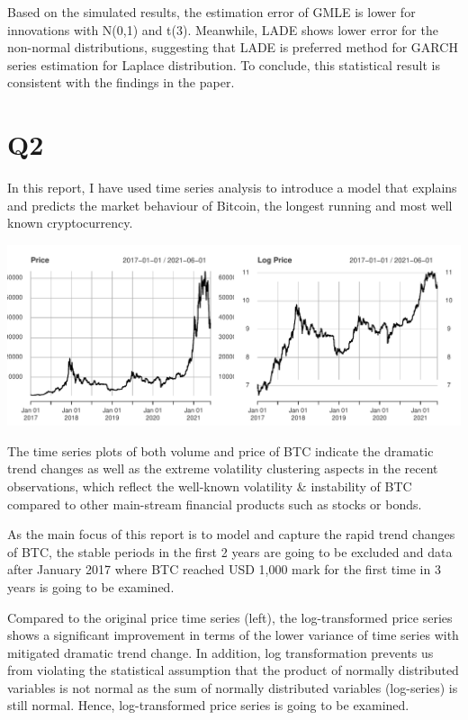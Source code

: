 \documentclass[
  11pt,
]{article}
\begin{document}
Based on the simulated results, the estimation error of GMLE is lower
for innovations with N(0,1) and t(3). Meanwhile, LADE shows lower error
for the non-normal distributions, suggesting that LADE is preferred
method for GARCH series estimation for Laplace distribution. To
conclude, this statistical result is consistent with the findings in the
paper.

\hypertarget{q2}{%
\section{Q2}\label{q2}}

In this report, I have used time series analysis to introduce a model
that explains and predicts the market behaviour of Bitcoin, the longest
running and most well known cryptocurrency.

\includegraphics{ST436_Project_files/figure-latex/unnamed-chunk-10-1.pdf}

The time series plots of both volume and price of BTC indicate the
dramatic trend changes as well as the extreme volatility clustering
aspects in the recent observations, which reflect the well-known
volatility \& instability of BTC compared to other main-stream financial
products such as stocks or bonds.

As the main focus of this report is to model and capture the rapid trend
changes of BTC, the stable periods in the first 2 years are going to be
excluded and data after January 2017 where BTC reached USD 1,000 mark
for the first time in 3 years is going to be examined.

Compared to the original price time series (left), the log-transformed
price series shows a significant improvement in terms of the lower
variance of time series with mitigated dramatic trend change. In
addition, log transformation prevents us from violating the statistical
assumption that the product of normally distributed variables is not
normal as the sum of normally distributed variables (log-series) is
still normal. Hence, log-transformed price series is going to be
examined.
\end{document}
